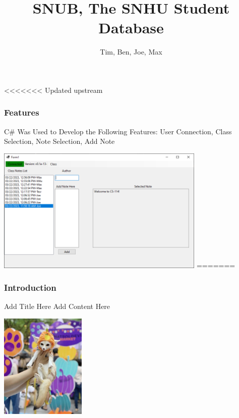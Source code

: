 \documentclass[aspectratio=169]{beamer}
\title{SNUB, The SNHU Student Database}
\author{Tim, Ben, Joe, Max}
\institute{SNHU CS-114}
\begin{document}
\frame{\titlepage} %

\begin{frame}
<<<<<<< Updated upstream
    \frametitle{Features}

    \begin{block}{\centering C\# Was Used to Develop the Following Features:}
        \centering User Connection, Class Selection, Note Selection, Add Note
    \end{block}

    \centering \includegraphics[height=6cm]{Sample_of_Features.PNG}
=======
    \frametitle{Introduction}

    \begin{block}{\centering Add Title Here}
        \centering Add Content Here
    \end{block}

    \centering \includegraphics[height=5cm]{what_is_this_thing.jpg}
\end{frame}
\end{document}

